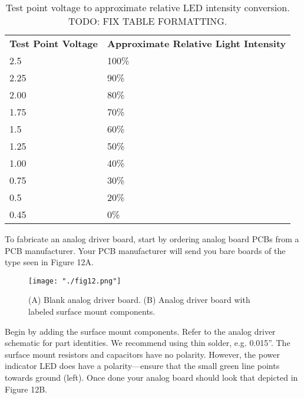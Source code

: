 \documentclass[11pt]{article}
\begin{document}
\begin{table}[H]
	\centering
	\begin{tabular}{ll}
		\centering
		\textbf{Test Point Voltage} & \textbf{Approximate Relative Light Intensity} \\
		2.5                         & 100\%                                         \\
		2.25                        & 90\%                                          \\
		2.00                        & 80\%                                          \\
		1.75                        & 70\%                                          \\
		1.5                         & 60\%                                          \\
		1.25                        & 50\%                                          \\
		1.00                        & 40\%                                          \\
		0.75                        & 30\%                                          \\
		0.5                         & 20\%                                          \\
		0.45                        & 0\%
	\end{tabular}
	\caption{Test point voltage to approximate relative LED intensity conversion. TODO: FIX TABLE FORMATTING.}
	\label{tab:analog-board-conversion}
\end{table}

To fabricate an analog driver board, start by ordering analog board PCBs from a PCB manufacturer. Your PCB manufacturer will send you bare boards of the type seen in Figure 12A.

\begin{figure}[H]
	\centering
	\texttt{[image: "./fig12.png"]}
	\caption{(A) Blank analog driver board. (B) Analog driver board with labeled surface mount components.}
\end{figure}

Begin by adding the surface mount components.
Refer to the analog driver schematic for part identities.
We recommend using thin solder, e.g. 0.015''.
The surface mount resistors and capacitors have no polarity.
However, the power indicator LED does have a polarity---ensure that the small green line points towards ground (left).
Once done your analog board should look that depicted in Figure 12B.
\end{document}
